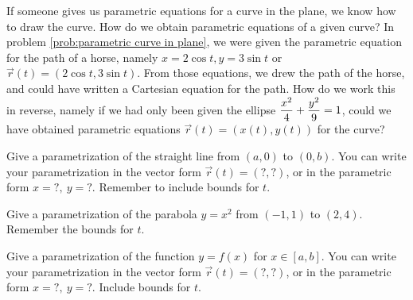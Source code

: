 If someone gives us parametric equations for a curve in the plane, we know how to draw the curve.  How do we obtain parametric equations of a given curve? In problem \ref{prob:parametric curve in plane}, we were given the parametric equation for the path of a horse, namely $x=2\cos t, y=3 \sin t$ or $\vec r(t)=(2\cos t,3\sin t)$. From those equations, we drew the path of the horse, and could have written a Cartesian equation for the path. How do we work this in reverse, namely if we had only been given the ellipse $\displaystyle\frac{x^2}{4}+\frac{y^2}{9}=1$, could we have obtained parametric equations $\vec r(t)=(x(t),y(t))$ for the curve?



\begin{problem}
 Give a parametrization of the straight line from $(a,0)$ to $(0,b)$. 
 You can write your parametrization in the vector form $\vec r(t)=(?,?)$, or in the parametric form $x=?,\ y=?$. 
 Remember to include bounds for $t$. 
\end{problem}



\begin{problem}
 Give a parametrization of the parabola $y=x^2$ from $(-1,1)$ to $(2,4)$. 
 Remember the bounds for $t$.
\end{problem}


\begin{problem}
 Give a parametrization of the function $y=f(x)$ for $x\in[a,b]$.
 You can write your parametrization in the vector form $\vec r(t)=(?,?)$, or in the parametric form $x=?,\ y=?$. 
 Include bounds for $t$.
\end{problem}

